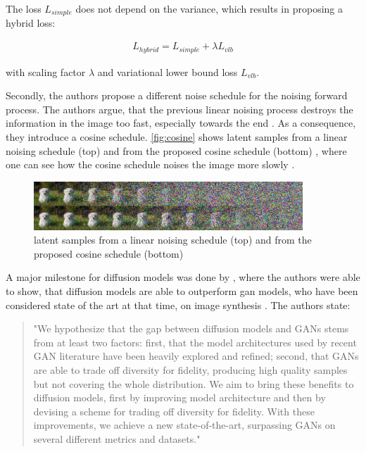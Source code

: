 The loss $L_{simple}$ does not depend on the variance, which results in \cite{nichol2021ImprovedDenoisingDiffusion} proposing a hybrid loss:

\begin{equation}
    \label{eqn:l_hybrid}
    \begin{align*}
        L_{hybrid} =L_{simple}+\lambda L_{vlb}
    \end{align*}
\end{equation}

with scaling factor $\lambda$ and variational lower bound loss $L_{vlb}$.

Secondly, the authors propose a different noise schedule for the noising forward process.
The authors argue, that the previous linear noising process destroys the information in the image too fast, especially towards the end \cite{nichol2021ImprovedDenoisingDiffusion}.
As a consequence, they introduce a cosine schedule.
\autoref{fig:cosine} shows latent samples from a linear noising schedule (top) and from the proposed cosine schedule (bottom) \cite[Figure 3, p. 4]{nichol2021ImprovedDenoisingDiffusion}, where one can see how the cosine schedule noises the image more slowly \cite{nichol2021ImprovedDenoisingDiffusion}.

\begin{figure}[h]
    \centering
    \includegraphics[width=0.9\textwidth]{images/cosine.png}
    \caption{latent samples from a linear noising schedule (top) and from the proposed cosine schedule (bottom) \cite[Figure 3, p. 4]{nichol2021ImprovedDenoisingDiffusion}}
    \label{fig:cosine}
\end{figure}

A major milestone for diffusion models was done by \cite{dhariwal2021DiffusionModelsBeat}, where the authors were able to show, that diffusion models are able to outperform \gls{gan}
models, who have been considered state of the art at that time, on image synthesis \cite{dhariwal2021DiffusionModelsBeat}.
The authors state:

\begin{quotation}
    "We hypothesize that the gap between diffusion models and GANs stems from at least two factors: 
    first, that the model architectures used by recent GAN literature have been heavily explored and refined; 
    second, that GANs are able to trade off diversity for fidelity, producing high quality samples but not covering the whole distribution. 
    We aim to bring these benefits to diffusion models, first by improving model architecture and then by devising a scheme for trading off diversity for fidelity. 
    With these improvements, we achieve a new state-of-the-art, surpassing GANs on several different metrics and datasets." \cite[p. 2]{dhariwal2021DiffusionModelsBeat}
\end{quotation}


